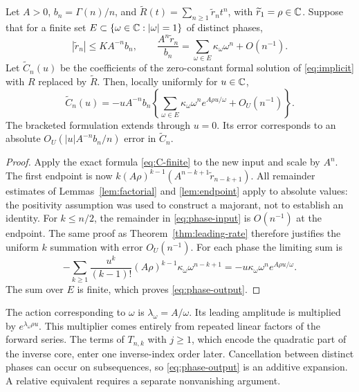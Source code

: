 \begin{theorem}
\label{thm:finite-phases}
Let $A>0$, $b_n=\Gamma(n)/n$, and
$\widetilde R(t)=\sum_{n\ge1}\widetilde r_nt^n$, with
$\widetilde r_1=\rho\in\mathbb C$. Suppose that for a finite set
$E\subset\{\omega\in\mathbb C:|\omega|=1\}$ of distinct phases,
\begin{equation}\label{eq:phase-input}
 |\widetilde r_n|\le K A^{-n}b_n,\qquad
 \frac{A^n\widetilde r_n}{b_n}
 =\sum_{\omega\in E}\kappa_\omega\omega^n+O(n^{-1}).
\end{equation}
Let $\widetilde C_n(u)$ be the coefficients of the zero-constant formal
solution of \eqref{eq:implicit} with $R$ replaced by $\widetilde R$.
Then, locally uniformly for $u\in\mathbb C$,
\begin{equation}\label{eq:phase-output}
 \widetilde C_n(u)=-u A^{-n}b_n
 \left\{\sum_{\omega\in E}\kappa_\omega\omega^n
                   e^{A\rho u/\omega}+O_U(n^{-1})\right\}.
\end{equation}
The bracketed formulation extends through $u=0$. Its error corresponds to
an absolute $O_U(|u|A^{-n}b_n/n)$ error in $\widetilde C_n$.
\end{theorem}
\begin{proof}
Apply the exact formula \eqref{eq:C-finite} to the new input and scale by
$A^n$. The first endpoint is now
$k(A\rho)^{k-1}(A^{n-k+1}\widetilde r_{n-k+1})$.
All remainder estimates of Lemmas~\ref{lem:factorial} and
\ref{lem:endpoint} apply to absolute values: the positivity assumption
was used to construct a majorant, not to establish an identity.
For $k\le n/2$, the remainder in \eqref{eq:phase-input} is $O(n^{-1})$
at the endpoint. The same proof as Theorem~\ref{thm:leading-rate} therefore
justifies the uniform $k$ summation with error $O_U(n^{-1})$.
For each phase the limiting sum is
\[
 -\sum_{k\ge1}\frac{u^k}{(k-1)!}(A\rho)^{k-1}
                 \kappa_\omega\omega^{n-k+1}
 =-u\kappa_\omega\omega^n e^{A\rho u/\omega}.
\]
The sum over $E$ is finite, which proves \eqref{eq:phase-output}.
\end{proof}

The action corresponding to $\omega$ is $\lambda_\omega=A/\omega$.
Its leading amplitude is multiplied by $e^{\lambda_\omega\rho u}$.
This multiplier comes entirely from repeated linear factors of the
forward series. The terms of $T_{n,k}$ with $j\ge1$, which encode the
quadratic part of the inverse core, enter one inverse-index order later.
Cancellation between distinct phases can occur on subsequences, so
\eqref{eq:phase-output} is an additive expansion. A relative equivalent
requires a separate nonvanishing argument.

